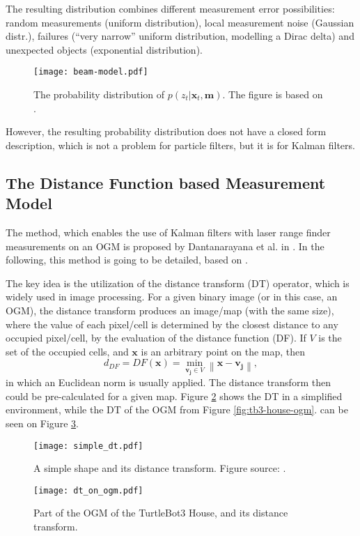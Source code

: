 The resulting distribution combines different measurement error possibilities:
random measurements (uniform distribution), local measurement noise (Gaussian distr.),
failures (``very narrow'' uniform distribution, modelling a Dirac delta) and unexpected
objects (exponential distribution).
\begin{figure}[htbp]
    \centering
    \texttt{[image: beam-model.pdf]}
    \caption{The probability distribution of $p(z_t | \mathbf{x}_t,\mathbf{m})$.
        The figure is based on \cite{Thrun2005}.}
    \label{fig:beam-model}
\end{figure}

However, the resulting probability distribution does not have a closed form description, which is
not a problem for particle filters, but it is for Kalman filters.

\subsection{The Distance Function based Measurement Model}\label{subsec:dt-meas-model}
The method, which enables the use of Kalman filters with laser range finder measurements on an OGM is proposed
by Dantanarayana et al. in \cite{Dantanarayana2013,Dantanarayana2016}.
In the following, this method is going to be detailed, based on \cite{Dantanarayana2016b}.

The key idea is the utilization of the distance transform (DT) operator, which is widely used in
image processing.
For a given binary image (or in this case, an OGM), the distance transform
produces an image/map (with the same size), where the value of each pixel/cell is
determined by the closest distance to any occupied pixel/cell,
by the evaluation of the distance function (DF).
If $V$ is the set of the occupied cells, and $\mathbf{x}$ is an arbitrary point on the map, then
\begin{equation}
    d_{D F}=D F(\mathbf{x})=\min _{\mathbf{v}_{\mathbf{j}} \in V}\left\|\mathbf{x}-\mathbf{v}_{\mathbf{j}}\right\|,
\end{equation}
in which an Euclidean norm is usually applied.
The distance transform then could be pre-calculated for a given map.
Figure \ref{fig:simple-dt} shows the DT in a simplified environment,
while the DT of the OGM from Figure \ref{fig:tb3-house-ogm}. can be seen on Figure \ref{fig:gazebo-map-ogm-dt}.
\begin{figure}[htbp]
    \centering
    \texttt{[image: simple\_dt.pdf]}
    \caption{A simple shape and its distance transform. Figure source: \cite{Dantanarayana2016b}.}
    \label{fig:simple-dt}
\end{figure}
\begin{figure}[htbp]
    \centering
    \texttt{[image: dt\_on\_ogm.pdf]}
    \caption{Part of the OGM of the TurtleBot3 House, and its distance transform.}
    \label{fig:gazebo-map-ogm-dt}
\end{figure}

